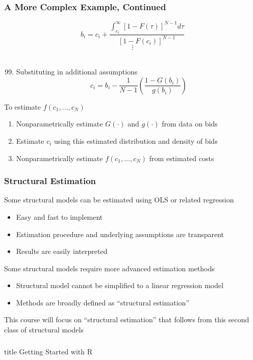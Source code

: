 \documentclass{beamer}
\begin{document}
\begin{frame}\frametitle{A More Complex Example, Continued}
    $$b_i = c_i + \frac{\int_{c_i}^\infty [1 - F(\tau)]^{N - 1} d\tau}{[1 - F(c_i)]^{N - 1}}$$
    $$\vdots$$ \\
    \begin{enumerate}
        \setcounter{enumi}{98}
        \item Substituting in additional assumptions
        $$c_i = b_i - \frac{1}{N - 1} \left( \frac{1 - G(b_i)}{g(b_i)} \right)$$
    \end{enumerate}
    To estimate $f(c_1, \ldots, c_N)$
    \begin{enumerate}
        \item Nonparametrically estimate $G(\cdot)$ and $g(\cdot)$ from data on bids
        \item Estimate $c_i$ using this estimated distribution and density of bids
        \item Nonparametrically estimate $f(c_1, \ldots, c_N)$ from estimated costs
    \end{enumerate}
\end{frame}

\begin{frame}\frametitle{Structural Estimation}
    Some structural models can be estimated using OLS or related regression
    \begin{itemize}
        \item Easy and fast to implement
        \item Estimation procedure and underlying assumptions are transparent
        \item Results are easily interpreted
    \end{itemize}
    \vspace{3ex}
    Some structural models require more advanced estimation methods
    \begin{itemize}
        \item Structural model cannot be simplified to a linear regression model
        \item Methods are broadly defined as ``structural estimation''
    \end{itemize}
    \vspace{3ex}
    This course will focus on ``structural estimation'' that follows from this second class of structural models
\end{frame}

\begin{frame}\frametitle{}
    \vfill
    \centering
    \begin{beamercolorbox}[center]{title}
        \Large Getting Started with R
    \end{beamercolorbox}
    \vfill
\end{frame}
\end{document}
